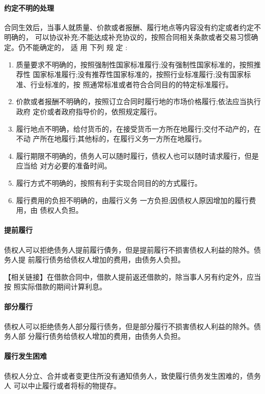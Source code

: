 \documentclass[UTF8,12pt]{ctexart}
\numberwithin{equation}{section} %
\numberwithin{figure}{section}
\numberwithin{table}{section}
\begin{document}
	\paragraph{约定不明的处理} 
	合同生效后，当事人就质量、价款或者报酬、履行地点等内容没有约定或者约定不明确的， 可以协议补充;不能达成补充协议的，按照合同相关条款或者交易习惯确定。仍不能确定的， 适 用 下列 规 定 : 
	\begin{enumerate}
		\item 质量要求不明确的，按照强制性国家标准履行;没有强制性国家标准的，按照推荐性 国家标准履行;没有推荐性国家标准的，按照行业标准履行;没有国家标准、行业标准的，按 照通常标准或者符合合同目的的特定标准履行。
		
		\item 价款或者报酬不明确的，按照订立合同时履行地的市场价格履行;依法应当执行政府 定价或者政府指导价的，依照规定履行。
		
		\item 履行地点不明确，给付货币的，在接受货币一方所在地履行;交付不动产的，在不动 产所在地履行;其他标的，在履行义务一方所在地履行。
		
		\item 履行期限不明确的，债务人可以随时履行，债权人也可以随时请求履行，但是应当给 对方必要的准备时间。
		
		\item 履行方式不明确的，按照有利于实现合同目的的方式履行。 
		
		\item 履行费用的负担不明确的，由履行义务 一方负担;因债权人原因增加的履行费用，由 债权人负担。
	\end{enumerate}

	
	\paragraph{提前履行} 债权人可以拒绝债务人提前履行債务，但是提前履行不损害债权人利益的除外。债务人提 前履行债务给债权人增加的费用，由债务人负担。
	
	【相关链接】在借款合同中，借款人提前返还借款的，除当事人另有约定外，应当按 照实际借款的期间计算利息。
	
	\paragraph{部分履行}
	债权人可以拒绝债务人部分履行债务，但是部分履行不损害债权人利益的除外。债务人部 分履行债务给债权人增加的费用，由债务人负担。
	
	\paragraph{履行发生困难}债权人分立、合并或者变更住所没有通知债务人，致使履行债务发生困难的，债务人 可以中止履行或者将标的物提存。
	
\end{document}
